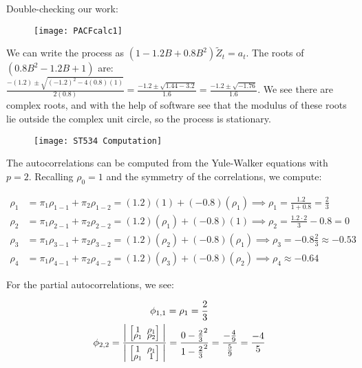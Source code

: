 \documentclass[12pt, letterpaper]{article}
\newcommand{\mymatrix}[1]{
	\renewcommand{\arraystretch}{0.5} %
	\setlength\arraycolsep{3pt}       %
	\scalebox{0.90}{                  %
		$\begin{bmatrix}
			#1
		\end{bmatrix}$
	}                   
	\renewcommand{\arraystretch}{1.0} %
	\setlength\arraycolsep{6pt}       %
}
\theoremstyle{definition}
\numberwithin{equation}{section}
\newcommand{\+}[1]{+_{\scalebox{.375}{#1}}}
\newcommand{\1}{\mathbbm{1}}
\begin{document}
Double-checking our work:

\begin{figure}[H]
	\centering
	\texttt{[image: PACFcalc1]}
\end{figure}



\newpage
\noindent\textbf{}
\vspace{\baselineskip}

We can write the process as $(1-1.2B+0.8B^2)\tilde{Z}_t=a_t$. The roots of $(0.8B^2-1.2B+1)$ are: $\frac{-(1.2) \pm \sqrt{(-1.2)^2-4(0.8)(1)}}{2(0.8)}=\frac{-1.2 \pm \sqrt{1.44-3.2}}{1.6}=\frac{-1.2 \pm \sqrt{-1.76}}{1.6}$. We see there are complex roots, and with the help of software see that the modulus of these roots lie outside the complex unit circle, so the process is stationary.

\begin{figure}[H]
	\centering
	\texttt{[image: ST534 Computation]}
\end{figure}

The autocorrelations can be computed from the Yule-Walker equations with $p=2$. Recalling $\rho_0=1$ and the symmetry of the correlations, we compute:

\vspace{-0.5cm}
\begin{align*}
	\rho_1&=\pi_1\rho_{1-1}+\pi_2\rho_{1-2}=(1.2)(1)+(-0.8)(\rho_1) \implies \rho_1=\frac{1.2}{1+0.8}=\frac{2}{3}\\
	\rho_2&=\pi_1\rho_{2-1}+\pi_2\rho_{2-2}=(1.2)(\rho_1)+(-0.8)(1) \implies \rho_2=\frac{1.2\cdot2}{3}-0.8=0\\
	\rho_3&=\pi_1\rho_{3-1}+\pi_2\rho_{3-2}=(1.2)(\rho_2)+(-0.8)(\rho_1) \implies \rho_3=-0.8\frac{2}{3}\approx -0.53\\
	\rho_4&=\pi_1\rho_{4-1}+\pi_2\rho_{4-2}=(1.2)(\rho_3)+(-0.8)(\rho_2) \implies \rho_4\approx -0.64
\end{align*} 

For the partial autocorrelations, we see:

\begin{gather*}
	\phi_{1,1}=\rho_1=\frac{2}{3}\\
	\phi_{2,2}=\frac{\left|\mymatrix{1 & \rho_1\\ \rho_1 & \rho_2}\right|}{\left|\mymatrix{1 & \rho_1\\ \rho_1 & 1}\right|}=\frac{0-\frac{2}{3}^2}{1-\frac{2}{3}^2}= \frac{-\frac{4}{9}}{\frac{5}{9}}=\frac{-4}{5}
\end{gather*} 
\end{document}
